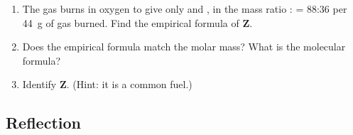 \documentclass[12pt, a4paper]{book}
\theoremstyle{definition}
\begin{document}
\begin{deepbox}
\begin{enumerate}[label=\textbf{D\arabic*.}]
\begin{enumerate}[label=(\alph*)]
          \item The gas burns in oxygen to give only 
                and , in the mass ratio
                : = 88:36 per \SI{44}{\gram}
                of gas burned.
                Find the empirical formula of \textbf{Z}.

          \item Does the empirical formula match the molar mass?
                What is the molecular formula?

          \item Identify \textbf{Z}.
                (Hint: it is a common fuel.)
        \end{enumerate}

\end{enumerate}
\end{deepbox}

\subsection*{Reflection}
\end{document}
